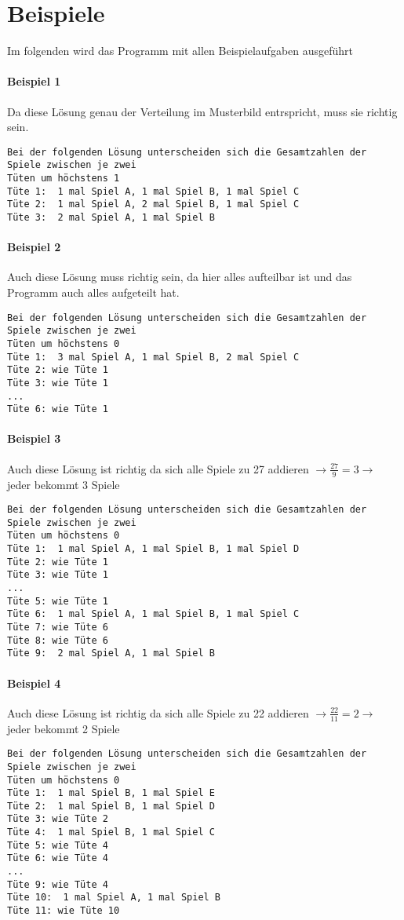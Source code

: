 \documentclass[a4paper,10pt,ngerman]{scrartcl}
\begin{document}
\section{Beispiele}
Im folgenden wird das Programm mit allen Beispielaufgaben ausgeführt
\paragraph{Beispiel 1}
Da diese Lösung genau der Verteilung im Musterbild entrspricht, muss sie richtig sein.
\begin{lstlisting}[frame=tb]
Bei der folgenden Lösung unterscheiden sich die Gesamtzahlen der Spiele zwischen je zwei 
Tüten um höchstens 1
Tüte 1:  1 mal Spiel A, 1 mal Spiel B, 1 mal Spiel C
Tüte 2:  1 mal Spiel A, 2 mal Spiel B, 1 mal Spiel C
Tüte 3:  2 mal Spiel A, 1 mal Spiel B
\end{lstlisting}

\paragraph{Beispiel 2}
Auch diese Lösung muss richtig sein, da hier alles aufteilbar ist und das Programm auch alles aufgeteilt hat.
\begin{lstlisting}[frame=tb]
Bei der folgenden Lösung unterscheiden sich die Gesamtzahlen der Spiele zwischen je zwei 
Tüten um höchstens 0
Tüte 1:  3 mal Spiel A, 1 mal Spiel B, 2 mal Spiel C
Tüte 2: wie Tüte 1
Tüte 3: wie Tüte 1
...
Tüte 6: wie Tüte 1
\end{lstlisting}


\paragraph{Beispiel 3}
Auch diese Lösung ist richtig da sich alle Spiele zu 27 addieren $\rightarrow \frac{27}{9}=3 \rightarrow$ jeder bekommt 3 Spiele
\begin{lstlisting}[frame=tb]
Bei der folgenden Lösung unterscheiden sich die Gesamtzahlen der Spiele zwischen je zwei 
Tüten um höchstens 0
Tüte 1:  1 mal Spiel A, 1 mal Spiel B, 1 mal Spiel D
Tüte 2: wie Tüte 1
Tüte 3: wie Tüte 1
...
Tüte 5: wie Tüte 1
Tüte 6:  1 mal Spiel A, 1 mal Spiel B, 1 mal Spiel C
Tüte 7: wie Tüte 6
Tüte 8: wie Tüte 6
Tüte 9:  2 mal Spiel A, 1 mal Spiel B
\end{lstlisting}

\paragraph{Beispiel 4}
Auch diese Lösung ist richtig da sich alle Spiele zu 22 addieren $\rightarrow \frac{22}{11}=2 \rightarrow$ jeder bekommt 2 Spiele
\begin{lstlisting}[frame=tb]
Bei der folgenden Lösung unterscheiden sich die Gesamtzahlen der Spiele zwischen je zwei 
Tüten um höchstens 0
Tüte 1:  1 mal Spiel B, 1 mal Spiel E
Tüte 2:  1 mal Spiel B, 1 mal Spiel D
Tüte 3: wie Tüte 2
Tüte 4:  1 mal Spiel B, 1 mal Spiel C
Tüte 5: wie Tüte 4
Tüte 6: wie Tüte 4
...
Tüte 9: wie Tüte 4
Tüte 10:  1 mal Spiel A, 1 mal Spiel B
Tüte 11: wie Tüte 10
\end{lstlisting}
\end{document}
